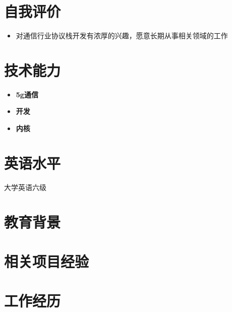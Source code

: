 \documentclass{resume}
\begin{document}



\section{自我评价}
\begin{itemize}
  
  \item 对通信行业协议栈开发有浓厚的兴趣，愿意长期从事相关领域的工作
\end{itemize}

\section{技术能力}
\begin{itemize}[parsep=0.2ex]
  \item \textbf{5g通信}
    \begin{itemize}
      
    \end{itemize}
  \item \textbf{开发}
    \begin{itemize}
      
    \end{itemize}
  \item \textbf{内核}
    \begin{itemize}
      
    \end{itemize}
\end{itemize}

\section{英语水平}
大学英语六级

\section{教育背景}

\vspace{4mm}

\section{相关项目经验}
\begin{itemize}[parsep=0.2ex]
  
\end{itemize}

\section{工作经历}

\end{document}
